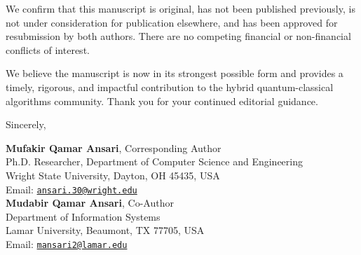 \documentclass[11pt,a4paper]{article}
\begin{document}
We confirm that this manuscript is original, has not been published previously, is not under consideration for publication elsewhere, and has been approved for resubmission by both authors. There are no competing financial or non-financial conflicts of interest.

We believe the manuscript is now in its strongest possible form and provides a timely, rigorous, and impactful contribution to the hybrid quantum-classical algorithms community. Thank you for your continued editorial guidance.

\vspace{1.2em}
\noindent Sincerely,

\vspace{1.0em}
\noindent
\textbf{Mufakir Qamar Ansari}, Corresponding Author\\
Ph.D. Researcher, Department of Computer Science and Engineering\\
Wright State University, Dayton, OH 45435, USA\\
Email: \href{mailto:ansari.30@wright.edu}{\texttt{ansari.30@wright.edu}}\\[0.8em]
\textbf{Mudabir Qamar Ansari}, Co-Author\\
Department of Information Systems\\
Lamar University, Beaumont, TX 77705, USA\\
Email: \href{mailto:mansari2@lamar.edu}{\texttt{mansari2@lamar.edu}}
\end{document}
